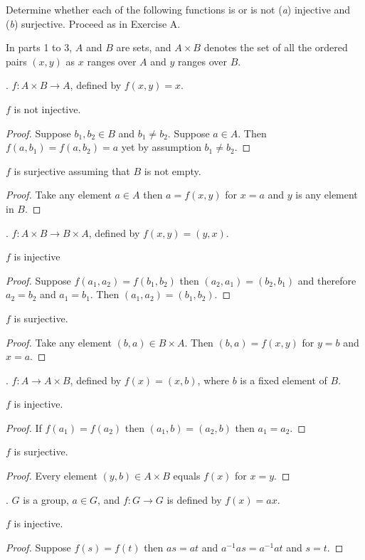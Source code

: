 \documentclass[twoside]{amsart}
\begin{document}
\begin{enumerate}[A.]
   \noindent Determine whether each of the following functions is or is not
   (\emph{a}) injective and (\emph{b}) surjective. Proceed as in Exercise
   A.

   In parts 1 to 3, $A$ and $B$ are sets, and $A \times B$ denotes the set
   of all the ordered pairs $(x,y)$ as $x$ ranges over $A$ and $y$
   ranges over $B$.

   . $f:A\times B\to A$, defined by $f(x,y)=x$.

   \noindent $f$ is not injective. \begin{proof}Suppose $b_1,b_2\in B$ and 
   $b_1\ne b_2$. Suppose $a\in A$. Then $f(a,b_1)=f(a,b_2)=a$ yet
   by assumption $b_1\ne b_2$.\end{proof}

   \noindent $f$ is surjective assuming that $B$ is not empty.
   \begin{proof}
   Take any element $a \in A$ then $a=f(x,y)$ for $x=a$ and $y$ is
   any element in $B$.
   \end{proof}

   . $f:A\times B \to B \times A$, defined by $f(x,y)=(y,x)$.

   \noindent $f$ is injective \begin{proof}Suppose $f(a_1,a_2)=f(b_1,b_2)$
   then $(a_2,a_1)=(b_2,b_1)$ and therefore $a_2=b_2$ and $a_1=b_1$.
   Then $(a_1,a_2)=(b_1,b_2)$.
   \end{proof}

   \noindent $f$ is surjective.
   \begin{proof}
   Take any element $(b,a)\in B \times A$. Then $(b,a)=f(x,y)$ for $y=b$
   and $x=a$.
   \end{proof}

   . $f:A \to A \times B$, defined by $f(x)=(x,b)$, where
   $b$ is a fixed element of $B$.

   \noindent $f$ is injective. \begin{proof}
   If $f(a_1)=f(a_2)$ then $(a_1,b)=(a_2,b)$ then $a_1=a_2$.\end{proof}

   \noindent $f$ is surjective. \begin{proof}
   Every element $(y,b)\in A \times B$ equals $f(x)$ for $x=y$.
   \end{proof}

   . $G$ is a group, $a\in G$, and $f:G \to G$ is defined
   by $f(x)=ax$.

   \noindent $f$ is injective. \begin{proof} Suppose 
   $f(s)=f(t)$ then $as=at$ and $a^{-1}as=a^{-1}at$ and $s=t$.\end{proof}


\end{enumerate}
\end{document}
